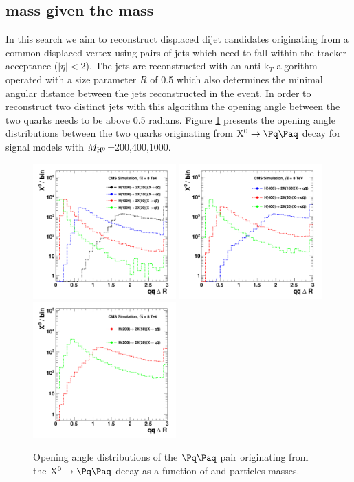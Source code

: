 \subsection{\X mass given the \Higgs mass}

In this search we aim to reconstruct displaced dijet candidates originating from a common displaced
vertex using pairs of 
 jets which need to fall 
within the tracker acceptance ($|\eta|<2$).  
 The jets are reconstructed with an anti-k$_T$
algorithm operated with a size parameter $R$ of 0.5 \cite{Cacciari:2008gp} which also determines
the minimal angular distance between the jets reconstructed in the event. 
In order to reconstruct two distinct
jets with this algorithm the opening angle between the two quarks needs to be above 0.5 radians.
Figure \ref{fig:sigdR} presents the opening angle distributions between the two quarks originating
from $\X \to \qq $ decay for signal models with 
$M_{\mathrm{H}^{0}}$=200,400,1000\GeV.  

\begin{figure}[htbp]
\centering
\includegraphics[width=0.49\textwidth]{plots/signal/dRH1000.pdf}
\includegraphics[width=0.49\textwidth]{plots/signal/dRH400.pdf}
\includegraphics[width=0.49\textwidth]{plots/signal/dRH200.pdf}
\caption{Opening angle distributions of the $\qq$ pair originating from the $\X \to \qq$ decay as a function
of \Higgs and \X particles masses. \label{fig:sigdR}}
\end{figure}

